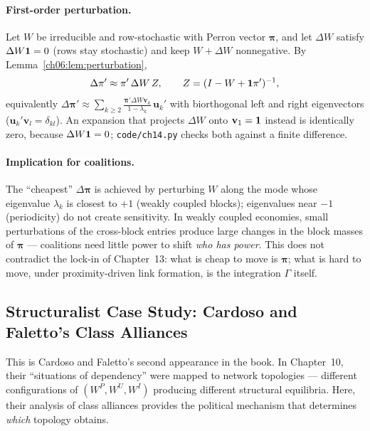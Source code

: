 \documentclass[../structural_economics_book.tex]{subfiles}
\begin{document}
\paragraph{First-order perturbation.} Let $W$ be irreducible and row-stochastic with Perron vector $\boldsymbol{\pi}$, and let $\Delta W$ satisfy $\Delta W\mathbf{1} = 0$ (rows stay stochastic) and keep $W + \Delta W$ nonnegative. By Lemma~\ref{ch06:lem:perturbation},
\begin{equation}
\Delta\pi' \approx \pi'\,\Delta W\, Z, \qquad Z = (I - W + \mathbf{1}\pi')^{-1},
\end{equation}
equivalently $\Delta\boldsymbol{\pi}' \approx \sum_{k \geq 2} \frac{\boldsymbol{\pi}'\Delta W \mathbf{v}_k}{1 - \lambda_k}\,\mathbf{u}_k'$ with biorthogonal left and right eigenvectors ($\mathbf{u}_k'\mathbf{v}_l = \delta_{kl}$). An expansion that projects $\Delta W$ onto $\mathbf{v}_1 = \mathbf{1}$ instead is identically zero, because $\Delta W\mathbf{1} = 0$; \texttt{code/ch14.py} checks both against a finite difference.

\paragraph{Implication for coalitions.} The ``cheapest'' $\Delta\boldsymbol{\pi}$ is achieved by perturbing $W$ along the mode whose eigenvalue $\lambda_k$ is closest to $+1$ (weakly coupled blocks); eigenvalues near $-1$ (periodicity) do not create sensitivity. In weakly coupled economies, small perturbations of the cross-block entries produce large changes in the block masses of $\boldsymbol{\pi}$ --- coalitions need little power to shift \emph{who has power}. This does not contradict the lock-in of Chapter~13: what is cheap to move is $\boldsymbol{\pi}$; what is hard to move, under proximity-driven link formation, is the integration $\Gamma$ itself.


\subsection*{Structuralist Case Study: Cardoso and Faletto's Class Alliances}

This is Cardoso and Faletto's second appearance in the book. In Chapter~10, their ``situations of dependency'' were mapped to network topologies --- different configurations of $(W^P, W^U, W^I)$ producing different structural equilibria. Here, their analysis of class alliances provides the political mechanism that determines \textit{which} topology obtains.
\end{document}
